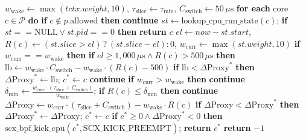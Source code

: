 \documentclass[letterpaper,twocolumn,10pt]{article}
\begin{document}
\begin{algorithm}[t]
\begin{algorithmic}[1]
\STATE \quad $w_{\mathrm{wake}} \leftarrow \max(tctx.weight, 10)$, $\tau_{\mathrm{slice}} \leftarrow \tau_{\min}$, $C_{\mathrm{switch}} \leftarrow 50\,\mu\text{s}$
\STATE \quad \textbf{for each} core $c \in \mathcal{P}$ \textbf{do}
\STATE \quad \quad \textbf{if} $c \notin p.\text{allowed}$ \textbf{then} \textbf{continue}
\STATE \quad \quad $st \leftarrow \text{lookup\_cpu\_run\_state}(c)$; \textbf{if} $st == \text{NULL} \lor st.pid == 0$ \textbf{then} \textbf{return} $c$ 
\STATE \quad \quad $el \leftarrow now - st.start$, $R(c) \leftarrow (st.slice > el) \,?\, (st.slice - el) : 0$, $w_{\mathrm{curr}} \leftarrow \max(st.weight, 10)$
\STATE \quad \quad \textbf{if} $w_{\mathrm{curr}} == w_{\mathrm{wake}}$ \textbf{then} 
\STATE \quad \quad \quad \textbf{if} $el \ge 1{,}000\,\mu\text{s} \land R(c) > 500\,\mu\text{s}$ \textbf{then}
\STATE \quad \quad \quad \quad $\text{lb} \leftarrow w_{\mathrm{wake}} \cdot C_{\mathrm{switch}} - w_{\mathrm{wake}} \cdot (R(c) - 500)$
\STATE \quad \quad \quad \quad \textbf{if} $\text{lb} < \Delta\mathrm{Proxy}^*$ \textbf{then} $\Delta\mathrm{Proxy}^* \leftarrow \text{lb}$; $c^* \leftarrow c$
\STATE \quad \quad \quad \textbf{continue}
\STATE \quad \quad \textbf{if} $w_{\mathrm{curr}} > w_{\mathrm{wake}}$ \textbf{then} \textbf{continue} 
\STATE \quad \quad $\delta_{\min} \leftarrow \frac{w_{\mathrm{curr}} \cdot (\tau_{\mathrm{slice}} + C_{\mathrm{switch}})}{w_{\mathrm{wake}}}$; \textbf{if} $R(c) \le \delta_{\min}$ \textbf{then} \textbf{continue} 
\STATE \quad \quad $\Delta\mathrm{Proxy} \leftarrow w_{\mathrm{curr}} \cdot (\tau_{\mathrm{slice}} + C_{\mathrm{switch}}) - w_{\mathrm{wake}} \cdot R(c)$
\STATE \quad \quad \textbf{if} $\Delta\mathrm{Proxy} < \Delta\mathrm{Proxy}^*$ \textbf{then} $\Delta\mathrm{Proxy}^* \leftarrow \Delta\mathrm{Proxy}$; $c^* \leftarrow c$
\STATE \quad \textbf{if} $c^* \ge 0 \land \Delta\mathrm{Proxy}^* < 0$ \textbf{then} $\text{scx\_bpf\_kick\_cpu}(c^*, \text{SCX\_KICK\_PREEMPT})$; \textbf{return} $c^*$
\STATE \quad \textbf{return} $-1$
\end{algorithmic}
\end{algorithm}
\end{document}
